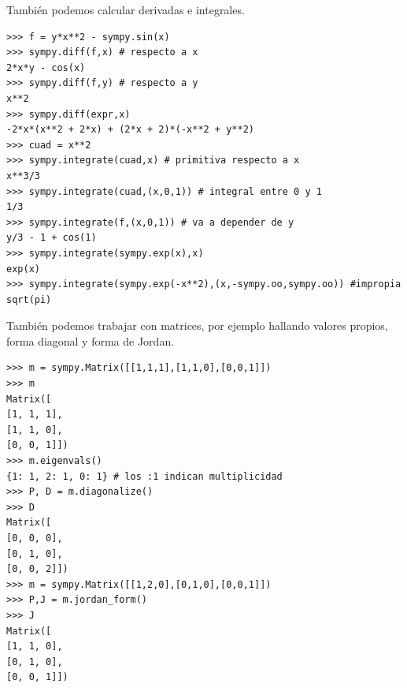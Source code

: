\documentclass[a4paper, 12pt]{report}
\theoremstyle{definition}
\begin{document}
También podemos calcular derivadas e integrales.
\begin{verbatim}
>>> f = y*x**2 - sympy.sin(x)
>>> sympy.diff(f,x) # respecto a x
2*x*y - cos(x)
>>> sympy.diff(f,y) # respecto a y
x**2
>>> sympy.diff(expr,x)
-2*x*(x**2 + 2*x) + (2*x + 2)*(-x**2 + y**2)
>>> cuad = x**2
>>> sympy.integrate(cuad,x) # primitiva respecto a x
x**3/3
>>> sympy.integrate(cuad,(x,0,1)) # integral entre 0 y 1
1/3
>>> sympy.integrate(f,(x,0,1)) # va a depender de y
y/3 - 1 + cos(1)
>>> sympy.integrate(sympy.exp(x),x)
exp(x)
>>> sympy.integrate(sympy.exp(-x**2),(x,-sympy.oo,sympy.oo)) #impropia
sqrt(pi)
\end{verbatim}
También podemos trabajar con matrices, por ejemplo hallando valores propios, forma diagonal y forma de Jordan.
\begin{verbatim}
>>> m = sympy.Matrix([[1,1,1],[1,1,0],[0,0,1]])
>>> m
Matrix([
[1, 1, 1],
[1, 1, 0],
[0, 0, 1]])
>>> m.eigenvals()
{1: 1, 2: 1, 0: 1} # los :1 indican multiplicidad
>>> P, D = m.diagonalize()
>>> D
Matrix([
[0, 0, 0],
[0, 1, 0],
[0, 0, 2]])
>>> m = sympy.Matrix([[1,2,0],[0,1,0],[0,0,1]])
>>> P,J = m.jordan_form()
>>> J
Matrix([
[1, 1, 0],
[0, 1, 0],
[0, 0, 1]])
\end{verbatim}
\end{document}
